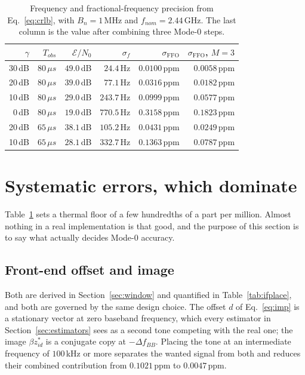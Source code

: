 \documentclass[11pt,a4paper]{article}
\newcommand{\us}{\,\ensuremath{\upmu}s}
\newcommand{\FFO}{\mathrm{FFO}}
\providecommand{\upmu}{\mu}
\begin{document}
\begin{table}[h]
\caption{Frequency and fractional-frequency precision from Eq.~\eqref{eq:crlb}, with $B_n=1$\,MHz and
$f_{nom}=2.44$\,GHz. The last column is the value after combining three Mode-0 steps.}
\label{tab:crlb}
\centering\small
\begin{tabular}{@{}rrrrrr@{}}
\toprule
$\gamma$ & $T_{obs}$ & $\mathcal{E}/N_0$ & $\sigma_f$ & $\sigma_\FFO$ & $\sigma_\FFO$, $M{=}3$ \\
\midrule
30\,dB & $80\us$ & $49.0$\,dB & $24.4$\,Hz  & $0.0100$\,ppm & $0.0058$\,ppm \\
20\,dB & $80\us$ & $39.0$\,dB & $77.1$\,Hz  & $0.0316$\,ppm & $0.0182$\,ppm \\
10\,dB & $80\us$ & $29.0$\,dB & $243.7$\,Hz & $0.0999$\,ppm & $0.0577$\,ppm \\
 0\,dB & $80\us$ & $19.0$\,dB & $770.5$\,Hz & $0.3158$\,ppm & $0.1823$\,ppm \\
20\,dB & $65\us$ & $38.1$\,dB & $105.2$\,Hz & $0.0431$\,ppm & $0.0249$\,ppm \\
10\,dB & $65\us$ & $28.1$\,dB & $332.7$\,Hz & $0.1363$\,ppm & $0.0787$\,ppm \\
\bottomrule
\end{tabular}
\end{table}

\section{Systematic errors, which dominate}
\label{sec:systematic}

Table~\ref{tab:crlb} sets a thermal floor of a few hundredths of a part per million. Almost nothing
in a real implementation is that good, and the purpose of this section is to say what actually
decides Mode-0 accuracy.

\subsection{Front-end offset and image}

Both are derived in Section~\ref{sec:window} and quantified in Table~\ref{tab:ifplace}, and both are
governed by the same design choice. The offset $d$ of Eq.~\eqref{eq:imp} is a stationary vector at
zero baseband frequency, which every estimator in Section~\ref{sec:estimators} sees as a second tone
competing with the real one; the image $\beta z_{id}^{*}$ is a conjugate copy at $-\Delta f_{BB}$.
Placing the tone at an intermediate frequency of $100$\,kHz or more separates the wanted signal from
both and reduces their combined contribution from $0.1021$\,ppm to $0.0047$\,ppm.
\end{document}

